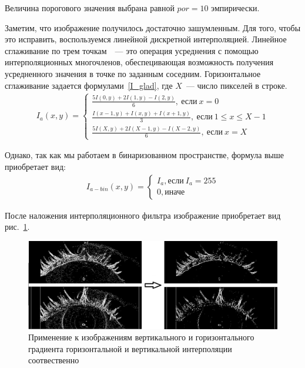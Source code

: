 \documentclass[12pt]{article} %
\begin{document}
Величина порогового значения выбрана равной $por=10$ эмпирически.

Заметим, что изображение получилось достаточно зашумленным. Для того, чтобы это исправить, воспользуемся линейной дискретной интерполяцией. Линейное сглаживание по трем точкам~\cite{Inter}~--- это операция усреднения с помощью интерполяционных многочленов, обеспецивающая возможность получения усредненного значения в точке по заданным соседним. Горизонтальное сглаживание задается формулами~\ref{I_glad}, где $X$~--- число пикселей в строке.
\begin{gather}\label{I_glad}
	I_a(x,y) = \begin{cases}
		\frac{5I(0,y)+2I(1,y)-I(2,y)}{6},~\text{если}~x=0
		\\
		\frac{I(x-1,y)+I(x,y)+I(x+1,y)}{3},~\text{если}~1\leq x\leq X-1
		\\
			\frac{5I(X,y)+2I(X-1,y)-I(X-2,y)}{6},~\text{если}~x=X
	\end{cases}
\end{gather}

Однако, так как мы работаем в бинаризованном пространстве, формула выше приобретает вид:
\begin{gather}\label{I_glad_bin}
	I_{a-bin}(x,y) = \begin{cases}
		I_a, \text{если}~I_a = 255
		\\
		0, \text{иначе}
	\end{cases}
\end{gather}

После наложения интерполяционного фильтра изображение приобретает вид рис.~\ref{fig:I_glad}.

\begin{figure}[h]
	
	\centering
	
	\includegraphics[width=0.8\linewidth]{I_glad.jpg}
	
	\caption{Применение к изображениям вертикального и горизонтального градиента горизонтальной и вертикальной интерполяции соотвественно}
	
	\label{fig:I_glad}
	
\end{figure}
\end{document}
